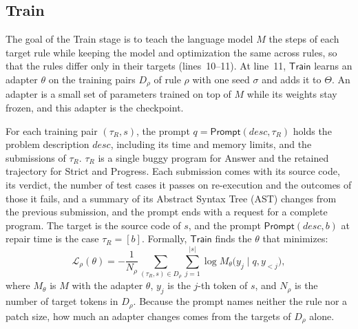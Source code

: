\documentclass[conference]{IEEEtran}
\begin{document}
\subsection{Train}
\label{sec:train}
The goal of the Train stage is to teach the language model \(M\) the steps of each target rule while keeping the model and optimization the same across rules, so that the rules differ only in their targets (lines~10--11). At line~11, \(\mathsf{Train}\) learns an adapter \(\theta\) on the training pairs \(D_\rho\) of rule \(\rho\) with one seed \(\sigma\) and adds it to \(\Theta\). An adapter is a small set of parameters trained on top of \(M\) while its weights stay frozen, and this adapter is the checkpoint.

For each training pair \((\tau_R,s)\), the prompt \(q=\mathsf{Prompt}(\mathit{desc},\tau_R)\) holds the problem description \(\mathit{desc}\), including its time and memory limits, and the submissions of \(\tau_R\). \(\tau_R\) is a single buggy program for Answer and the retained trajectory for Strict and Progress. Each submission comes with its source code, its verdict, the number of test cases it passes on re-execution and the outcomes of those it fails, and a summary of its Abstract Syntax Tree (AST) changes from the previous submission, and the prompt ends with a request for a complete program. The target is the source code of \(s\), and the prompt \(\mathsf{Prompt}(\mathit{desc},b)\) at repair time is the case \(\tau_R=[b]\). Formally, \(\mathsf{Train}\) finds the \(\theta\) that minimizes:
\[
 \mathcal L_\rho(\theta)=-\frac{1}{N_\rho}\sum_{(\tau_R,s)\in D_\rho}\sum_{j=1}^{|s|}\log M_\theta\bigl(y_j\mid q,y_{<j}\bigr),
\]
where \(M_\theta\) is \(M\) with the adapter \(\theta\), \(y_j\) is the \(j\)-th token of \(s\), and \(N_\rho\) is the number of target tokens in \(D_\rho\). Because the prompt names neither the rule nor a patch size, how much an adapter changes comes from the targets of \(D_\rho\) alone.
\end{document}
